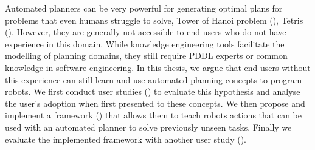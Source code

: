 Automated planners can be very powerful for generating optimal plans for problems that even humans struggle to solve, \eg Tower of Hanoi problem (\cite{hanoiPddlGit}), Tetris (\cite{ipc14site}).
However, they are generally not accessible to end-users who do not have experience in this domain. 
While knowledge engineering tools facilitate the modelling of planning domains, they still require PDDL experts or common knowledge in software engineering.
In this thesis, we argue that end-users without this experience can still learn and use automated planning concepts to program robots.
We first conduct user studies () to evaluate this hypothesis and analyse the user's adoption when first presented to these concepts.
We then propose and implement a framework () that allows them to teach robots actions that can be used with an automated planner to solve previously unseen tasks.
Finally we evaluate the implemented framework with another user study ().



